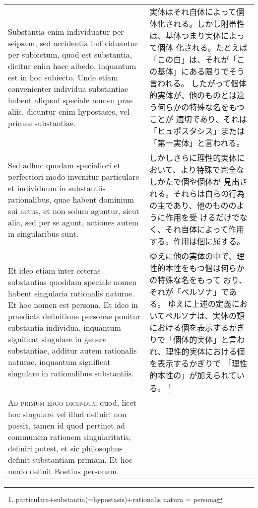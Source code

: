 \documentclass[10pt]{jsarticle} %
\begin{document}
\begin{longtable}{p{21em}p{21em}}
\\


Substantia enim individuatur per seipsam, sed
accidentia individuantur per subiectum, quod est substantia, dicitur
enim haec albedo, inquantum est in hoc subiecto. Unde etiam convenienter
individua substantiae habent aliquod speciale nomen prae aliis, dicuntur
enim hypostases, vel primae substantiae. 


&

実体はそれ自体によって個体化される。しかし附帯性は、基体つまり実体によって個体
 化される。たとえば「この白」は、それが「この基体」にある限りでそう言われる。
 したがって個体的実体が、他のものとは違う何らかの特殊な名をもつことが
 適切であり、それは「ヒュポスタシス」または「第一実体」と言われる。


\\


Sed adhuc quodam specialiori et
perfectiori modo invenitur particulare et individuum in substantiis
rationalibus, quae habent dominium sui actus, et non solum aguntur,
sicut alia, sed per se agunt, actiones autem in singularibus sunt. 



&

しかしさらに理性的実体において、より特殊で完全なしかたで個や個体が
 見出される。それらは自らの行為の主であり、他のもののように作用を受
 けるだけでなく、それ自体によって作用する。作用は個に属する。


\\


Et
ideo etiam inter ceteras substantias quoddam speciale nomen habent
singularia rationalis naturae. Et hoc nomen est persona. Et ideo in
praedicta definitione personae ponitur substantia individua, inquantum
significat singulare in genere substantiae, additur autem rationalis
naturae, inquantum significat singulare in rationalibus substantiis.


&

ゆえに他の実体の中で、理性的本性をもつ個は何らかの特殊な名をもって
 おり、それが「ペルソナ」である。
ゆえに上述の定義においてペルソナは、実体の類における個を表示するかぎ
 りで「個体的実体」と言われ、理性的実体における個を表示するかぎりで
 「理性的本性の」が加えられている。
 \footnote{particulare+substantia(=hypostasis)+rationalis natura = persona}


\\



{\scshape Ad primum ergo dicendum} quod, licet hoc singulare vel illud definiri non
possit, tamen id quod pertinet ad communem rationem singularitatis,
definiri potest, et sic philosophus definit substantiam primam. Et hoc
modo definit Boetius personam.



\end{longtable}
\end{document}
